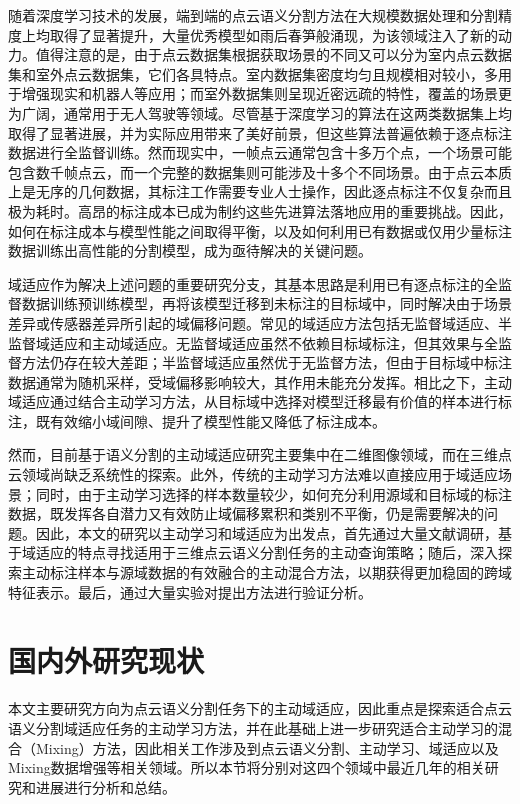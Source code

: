     随着深度学习技术的发展，端到端的点云语义分割方法在大规模数据处理和分割精度上均取得了显著提升，大量优秀模型如雨后春笋般涌现，为该领域注入了新的动力。值得注意的是，由于点云数据集根据获取场景的不同又可以分为室内点云数据集和室外点云数据集，它们各具特点。室内数据集密度均匀且规模相对较小，多用于增强现实和机器人等应用；而室外数据集则呈现近密远疏的特性，覆盖的场景更为广阔，通常用于无人驾驶等领域。尽管基于深度学习的算法在这两类数据集上均取得了显著进展，并为实际应用带来了美好前景，但这些算法普遍依赖于逐点标注数据进行全监督训练。然而现实中，一帧点云通常包含十多万个点，一个场景可能包含数千帧点云，而一个完整的数据集则可能涉及十多个不同场景。由于点云本质上是无序的几何数据，其标注工作需要专业人士操作，因此逐点标注不仅复杂而且极为耗时。高昂的标注成本已成为制约这些先进算法落地应用的重要挑战。因此，如何在标注成本与模型性能之间取得平衡，以及如何利用已有数据或仅用少量标注数据训练出高性能的分割模型，成为亟待解决的关键问题。

    域适应作为解决上述问题的重要研究分支，其基本思路是利用已有逐点标注的全监督数据训练预训练模型，再将该模型迁移到未标注的目标域中，同时解决由于场景差异或传感器差异所引起的域偏移问题。常见的域适应方法包括无监督域适应、半监督域适应和主动域适应。无监督域适应虽然不依赖目标域标注，但其效果与全监督方法仍存在较大差距；半监督域适应虽然优于无监督方法，但由于目标域中标注数据通常为随机采样，受域偏移影响较大，其作用未能充分发挥。相比之下，主动域适应通过结合主动学习方法，从目标域中选择对模型迁移最有价值的样本进行标注，既有效缩小域间隙、提升了模型性能又降低了标注成本。
    
    然而，目前基于语义分割的主动域适应研究主要集中在二维图像领域，而在三维点云领域尚缺乏系统性的探索。此外，传统的主动学习方法难以直接应用于域适应场景；同时，由于主动学习选择的样本数量较少，如何充分利用源域和目标域的标注数据，既发挥各自潜力又有效防止域偏移累积和类别不平衡，仍是需要解决的问题。因此，本文的研究以主动学习和域适应为出发点，首先通过大量文献调研，基于域适应的特点寻找适用于三维点云语义分割任务的主动查询策略；随后，深入探索主动标注样本与源域数据的有效融合的主动混合方法，以期获得更加稳固的跨域特征表示。最后，通过大量实验对提出方法进行验证分析。

\section{国内外研究现状}
本文主要研究方向为点云语义分割任务下的主动域适应，因此重点是探索适合点云语义分割域适应任务的主动学习方法，并在此基础上进一步研究适合主动学习的混合（Mixing）方法，因此相关工作涉及到点云语义分割、主动学习、域适应以及Mixing数据增强等相关领域。所以本节将分别对这四个领域中最近几年的相关研究和进展进行分析和总结。
